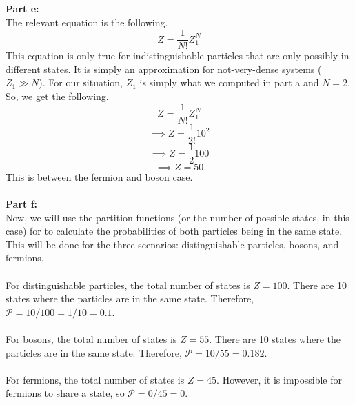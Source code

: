 \documentclass[12pt]{article}
\begin{document}
\begin{flushleft}
\textbf{Part e:}\\
The relevant equation is the following.
\begin{equation}
    Z=\frac{1}{N!}Z_1^N
\end{equation}
This equation is only true for indistinguishable particles that are only possibly in different states. It is simply an approximation for not-very-dense systems ($Z_1\gg N$).
For our situation, $Z_1$ is simply what we computed in part a and $N=2$.
So, we get the following.
$$Z=\frac{1}{N!}Z_1^N$$
$$\implies Z=\frac{1}{2!}10^2$$
$$\implies Z=\frac{1}{2}100$$
$$\implies Z=50$$
This is between the fermion and boson case.\\~\\

\textbf{Part f:}\\
Now, we will use the partition functions (or the number of possible states, in this case) for to calculate the probabilities of both particles being in the same state.
This will be done for the three scenarios: distinguishable particles, bosons, and fermions.\\~\\

For distinguishable particles, the total number of states is $Z=100$.
There are 10 states where the particles are in the same state.
Therefore, $\mathcal{P}=10/100=1/10=0.1$.\\~\\

For bosons, the total number of states is $Z=55$.
There are 10 states where the particles are in the same state.
Therefore, $\mathcal{P}=10/55=0.182$.\\~\\

For fermions, the total number of states is $Z=45$.
However, it is impossible for fermions to share a state, so $\mathcal{P}=0/45=0$.\\~\\





\end{flushleft}
\end{document}

